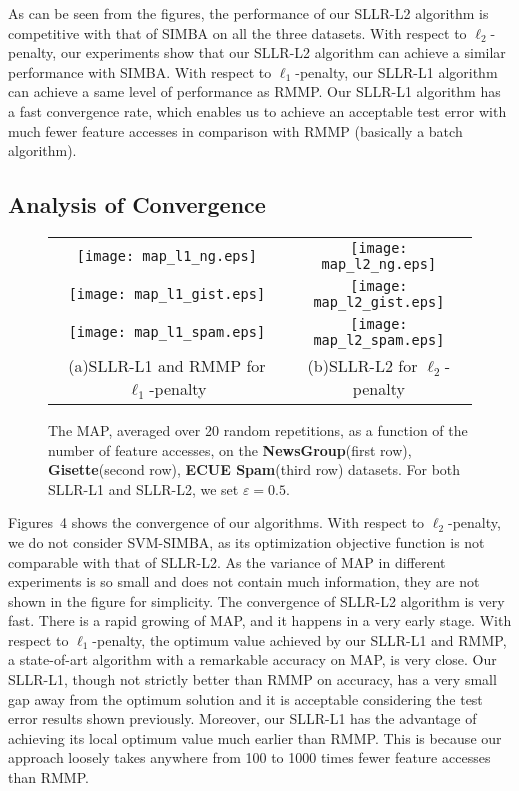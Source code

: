 \documentclass{llncs}
\begin{document}
As can be seen from the figures, the performance of our SLLR-L2 algorithm is competitive with that of SIMBA on all the three datasets.
With respect to $\ell_2$-penalty, our experiments show that our SLLR-L2 algorithm can achieve a similar performance with SIMBA.
With respect to $\ell_1$-penalty, our SLLR-L1 algorithm can achieve a same level of performance as RMMP.
Our SLLR-L1 algorithm has a fast convergence rate, which enables us to achieve an acceptable test error with much fewer feature accesses in comparison with RMMP (basically a batch algorithm).
	
\subsection{Analysis of Convergence}
	
\begin{figure}[ht] \label{fig:04}
    \begin{tabular}{cc}
\hspace{-0.9cm}	\texttt{[image: map\_l1\_ng.eps]}
&\hspace{-0.5cm}\texttt{[image: map\_l2\_ng.eps]} \\
\hspace{-0.9cm}	\texttt{[image: map\_l1\_gist.eps]}
&\hspace{-0.5cm}\texttt{[image: map\_l2\_gist.eps]} \\
\hspace{-0.9cm}	\texttt{[image: map\_l1\_spam.eps]}
&\hspace{-0.5cm}\texttt{[image: map\_l2\_spam.eps]} \\
(a)SLLR-L1 and RMMP for $\ell_1$-penalty & (b)SLLR-L2 for $\ell_2$-penalty
	\end{tabular}
\caption{The MAP, averaged over 20 random repetitions, as a function of the number of feature accesses, on the \textbf{NewsGroup}(first row), \textbf{Gisette}(second row), \textbf{ECUE Spam}(third row) datasets. For both SLLR-L1 and SLLR-L2, we set $\varepsilon=0.5$.}
\end{figure}
	
Figures~4 shows the convergence of our algorithms.
With respect to $\ell_2$-penalty, we do not consider SVM-SIMBA, as its optimization objective function is not comparable with that of SLLR-L2.
As the variance of MAP in different experiments is so small and does not contain much information, they are not shown in the figure for simplicity.
The convergence of SLLR-L2 algorithm is very fast. There is a rapid growing of MAP, and it happens in a very early stage.
With respect to $\ell_1$-penalty, the optimum value achieved by our SLLR-L1 and RMMP, a state-of-art algorithm with a remarkable accuracy on MAP, is very close.
Our SLLR-L1, though not strictly better than RMMP on accuracy, has a very small gap away from the optimum solution and it is acceptable considering the test error results shown previously.
Moreover, our SLLR-L1 has the advantage of achieving its local optimum value much earlier than RMMP.
This is because our approach loosely takes anywhere from 100 to 1000 times fewer feature accesses than RMMP.
\end{document}
